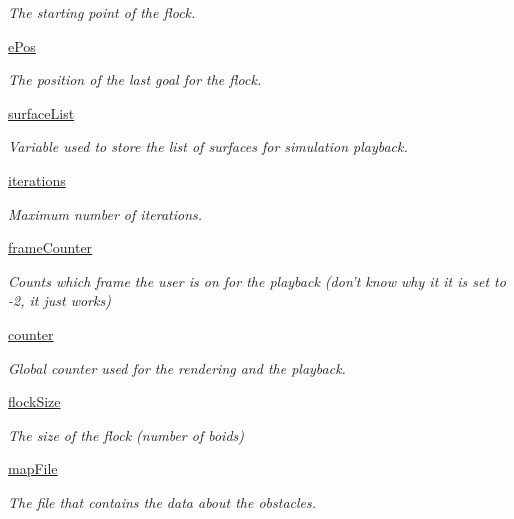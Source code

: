 \begin{DoxyCompactItemize}
\begin{DoxyCompactList}\small\item\em The starting point of the flock. \end{DoxyCompactList}\item 
\hyperlink{classboidsimulation_1_1FlockSim_acb064f74364917a97ca9d3accdf96f45}{e\-Pos}
\begin{DoxyCompactList}\small\item\em The position of the last goal for the flock. \end{DoxyCompactList}\item 
\hyperlink{classboidsimulation_1_1FlockSim_a60f47dc6f8186030cd22f3ca3b37c4e6}{surface\-List}
\begin{DoxyCompactList}\small\item\em Variable used to store the list of surfaces for simulation playback. \end{DoxyCompactList}\item 
\hyperlink{classboidsimulation_1_1FlockSim_a1febd4cacbdcffb5b9d096d4716af78f}{iterations}
\begin{DoxyCompactList}\small\item\em Maximum number of iterations. \end{DoxyCompactList}\item 
\hyperlink{classboidsimulation_1_1FlockSim_a7daba8b4e771dcd6f6a7357bda59c56a}{frame\-Counter}
\begin{DoxyCompactList}\small\item\em Counts which frame the user is on for the playback (don't know why it it is set to -\/2, it just works) \end{DoxyCompactList}\item 
\hyperlink{classboidsimulation_1_1FlockSim_af378fd310919691dec50f5d312931726}{counter}
\begin{DoxyCompactList}\small\item\em Global counter used for the rendering and the playback. \end{DoxyCompactList}\item 
\hyperlink{classboidsimulation_1_1FlockSim_a125fa6c2909527f18c768f09606ab442}{flock\-Size}
\begin{DoxyCompactList}\small\item\em The size of the flock (number of boids) \end{DoxyCompactList}\item 
\hyperlink{classboidsimulation_1_1FlockSim_a50b375f7caa0e33d87141d2cde14526f}{map\-File}
\begin{DoxyCompactList}\small\item\em The file that contains the data about the obstacles. \end{DoxyCompactList}\item 

\end{DoxyCompactItemize}

